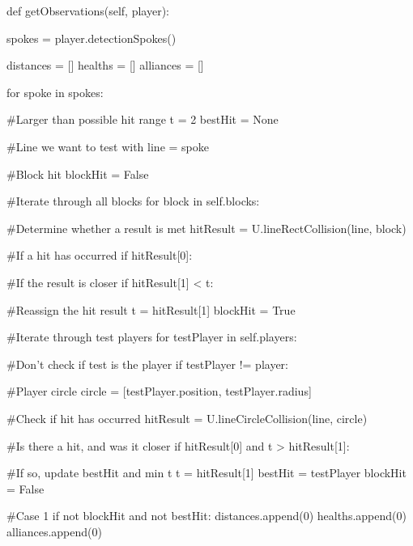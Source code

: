 \begin{mpy}
    def getObservations(self, player):

        spokes = player.detectionSpokes()

        distances = []
        healths = []
        alliances = []

        for spoke in spokes:


            #Larger than possible hit range
            t = 2
            bestHit = None
            
            #Line we want to test with
            line = spoke

            #Block hit
            blockHit = False


            #Iterate through all blocks
            for block in self.blocks:

                #Determine whether a result is met
                hitResult = U.lineRectCollision(line, block)

                #If a hit has occurred
                if hitResult[0]:

                    #If the result is closer
                    if hitResult[1] < t:

                        #Reassign the hit result
                        t = hitResult[1]
                        blockHit = True


            #Iterate through test players
            for testPlayer in self.players:

                #Don't check if test is the player
                if testPlayer != player:

                    #Player circle
                    circle = [testPlayer.position, testPlayer.radius]

                    #Check if hit has occurred
                    hitResult = U.lineCircleCollision(line, circle)

                    #Is there a hit, and was it closer
                    if hitResult[0] and t > hitResult[1]:

                        #If so, update bestHit and min t
                        t = hitResult[1]
                        bestHit = testPlayer
                        blockHit = False
                            
            #Case 1
            if not blockHit and not bestHit:
                distances.append(0)
                healths.append(0)
                alliances.append(0)


\end{mpy}
